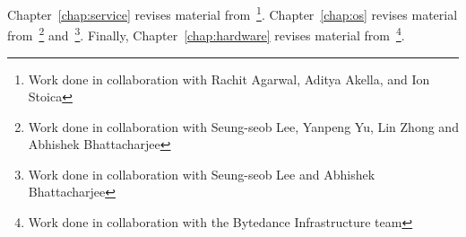 Chapter~\ref{chap:service} revises material from~\cite{jiffy}\footnote{Work done in collaboration with Rachit Agarwal, Aditya Akella, and Ion Stoica}. Chapter~\ref{chap:os} revises material from~\cite{mind}\footnote{Work done in collaboration with Seung-seob Lee, Yanpeng Yu, Lin Zhong and Abhishek Bhattacharjee} and~\cite{chase}\footnote{Work done in collaboration with Seung-seob Lee and Abhishek Bhattacharjee}. Finally, Chapter~\ref{chap:hardware} revises material from~\cite{cxleurosys}\footnote{Work done in collaboration with the Bytedance Infrastructure team}.
